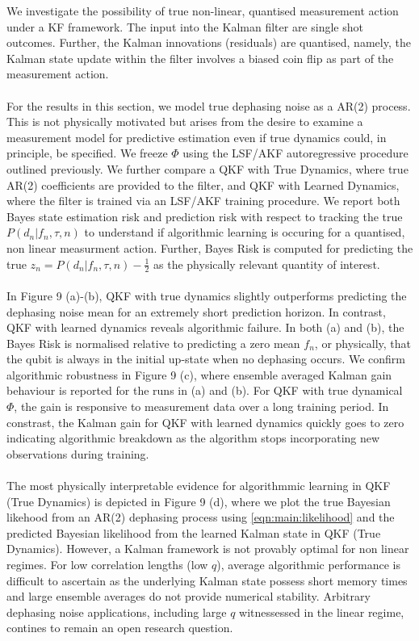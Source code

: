 We investigate the possibility of true non-linear, quantised measurement action under a KF framework.  The input into the Kalman filter are single shot outcomes. Further, the Kalman innovations (residuals) are quantised, namely, the Kalman state update within the filter involves a biased coin flip as part of the measurement action. 
\\
\\
For the results in this section, we model true dephasing noise as a AR(2) process. This is not physically motivated but arises from the desire to examine a measurement model for predictive estimation even if true dynamics could, in principle, be specified.  We freeze $\Phi$ using the LSF/AKF autoregressive procedure outlined previously. We further compare a QKF with True Dynamics, where true AR(2) coefficients are provided to the filter, and QKF with Learned Dynamics, where the filter is trained via an LSF/AKF training procedure. We report both Bayes state estimation risk and prediction risk with respect to tracking the true $P(d_n| f_n, \tau, n)$ to understand if algorithmic learning is occuring for a quantised, non linear measurment action. Further, Bayes Risk is computed for predicting the true $z_n =  P(d_n| f_n, \tau, n) - \frac{1}{2}$ as the physically relevant quantity of interest.
\\
\\
In Figure 9 (a)-(b),  QKF with true dynamics slightly outperforms predicting the dephasing noise mean for an extremely short prediction horizon. In contrast, QKF with learned dynamics reveals algorithmic failure.  In both (a) and (b), the Bayes Risk is normalised relative to predicting a zero mean $f_n$, or physically, that the qubit is always in the initial up-state when no dephasing occurs. We confirm algorithmic robustness in  Figure 9 (c), where ensemble averaged Kalman gain behaviour is reported for the runs in (a) and (b). For QKF with true dynamical $\Phi$, the gain is responsive to measurement data over a long training period. In constrast, the Kalman gain for QKF with learned dynamics quickly goes to zero indicating algorithmic breakdown as the algorithm stops incorporating new observations during training. 
\\
\\ 
The most physically interpretable evidence for algorithmmic learning in QKF (True Dynamics) is depicted in Figure 9 (d), where we plot the true Bayesian likehood from an AR(2) dephasing process using \cref{eqn:main:likelihood} and the predicted Bayesian likelihood from the learned Kalman state in QKF (True Dynamics). However, a Kalman framework is not provably optimal for non linear regimes. For low correlation lengths (low $q$), average algorithmic performance is difficult to ascertain as the underlying Kalman state possess short memory times and large ensemble averages do not provide numerical stability. Arbitrary dephasing noise applications, including large $q$ witnessessed in the linear regime, contines to remain an open research question. 

